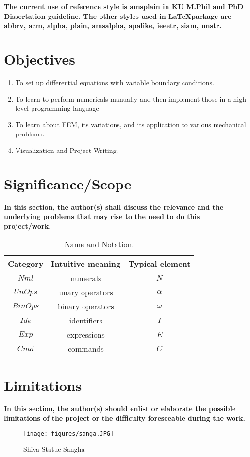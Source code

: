\noindent
{\color{blue} \bf The current use of reference style is {\color{red} amsplain} in KU M.Phil and PhD Dissertation guideline. The other styles used in \LaTeX package are abbrv, acm, alpha, plain, amsalpha, apalike, ieeetr, siam, unstr.}



\section{{\bf{Objectives}}}
{\bf\color{black}
\begin{enumerate}
 \item To set up differential equations with variable boundary conditions. 
 \item  To learn to perform numericals manually and then implement
 those in a high level programming language
 \item To learn about FEM, its variations, and its application to various
 mechanical problems.
 \item Visualization and Project Writing.
\end{enumerate}
}

\section{\bf Significance/Scope}
{\bf\color{red}In this section, the author(s) shall discuss the relevance and the underlying problems that may rise to the need to do this project/work.}
\begin{table}[htpb]
\caption{Name and Notation.}
\begin{center}
\begin{tabular}{|c|c|c|}\hline
Category & Intuitive meaning & Typical element \\ \hline
                                                    \hline
$\mathit{Nml}$ & numerals & $N$ \\ \hline
$\mathit{UnOps}$ & unary operators & $\alpha$ \\ \hline
$\mathit{BinOps}$ & binary operators & $\omega$ \\ \hline
$\mathit{Ide}$ & identifiers & $I$ \\ \hline
$\mathit{Exp}$ & expressions & $E$ \\ \hline
$\mathit{Cmd}$ & commands & $C$ \\ \hline
\end{tabular}
\end{center}
\end{table}

\section{\bf Limitations}
{\bf\color{red}In this section, the author(s) should enlist or elaborate the possible limitations of the project or the difficulty foreseeable during the work.}
\begin{figure}[htpb]
\begin{center}
\texttt{[image: figures/sanga.JPG]}
\caption{Shiva Statue Sangha}
\label{fig1.6}
\end{center}
\end{figure}
